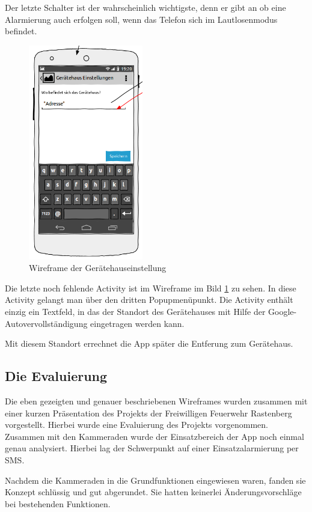 Der letzte Schalter ist der wahrscheinlich wichtigste, denn er gibt an ob eine Alarmierung auch erfolgen soll, wenn das Telefon sich im Lautlosenmodus befindet.

\begin{figure}
\vspace{-13pt}
\includegraphics[width=5cm]{Bilder/WireframeGeraetehaus.png}
\caption{Wireframe der Ger\"atehauseinstellung}
\label{Wireframe Geraetehaus}
\vspace{-250pt}
\end{figure}
Die letzte noch fehlende Activity ist im Wireframe im Bild \ref{Wireframe Geraetehaus} zu sehen. In diese Activity gelangt man \"uber den dritten Popupmen\"upunkt. Die Activity enth\"alt einzig ein Textfeld, in das der Standort des Ger\"atehauses mit Hilfe der Google-Autovervollst\"andigung eingetragen werden kann.

Mit diesem Standort errechnet die App sp\"ater die Entferung zum Ger\"atehaus.
\newpage

\subsection{Die Evaluierung}
Die eben gezeigten und genauer beschriebenen Wireframes wurden zusammen mit einer kurzen Pr\"asentation des Projekts der Freiwilligen Feuerwehr Rastenberg vorgestellt.
Hierbei wurde eine Evaluierung des Projekts vorgenommen. Zusammen mit den Kammeraden wurde der Einsatzbereich der App noch einmal genau analysiert. Hierbei lag der Schwerpunkt auf einer Einsatzalarmierung per SMS. 

Nachdem die Kammeraden in die Grundfunktionen eingewiesen waren, fanden sie Konzept schl\"ussig und gut abgerundet. Sie hatten keinerlei \"Anderungsvorschl\"age bei bestehenden Funktionen. 


